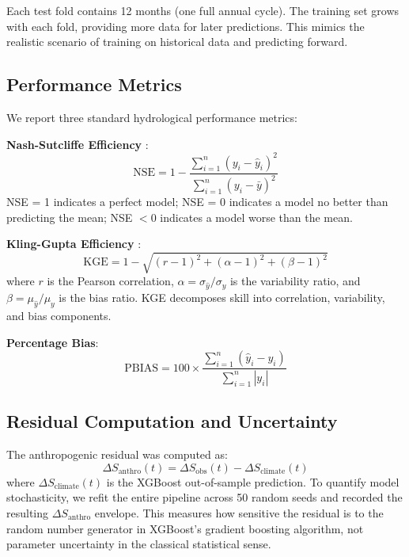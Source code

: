 \documentclass[12pt,a4paper,oneside]{report}
\newcommand{\dSobs}{\Delta S_{\mathrm{obs}}}
\newcommand{\dSclim}{\Delta S_{\mathrm{climate}}}
\newcommand{\dSanthro}{\Delta S_{\mathrm{anthro}}}
\newcommand{\NSE}{\mathrm{NSE}}
\newcommand{\KGE}{\mathrm{KGE}}
\begin{document}
Each test fold contains 12 months (one full annual cycle). The training set
grows with each fold, providing more data for later predictions. This mimics
the realistic scenario of training on historical data and predicting forward.

\subsection{Performance Metrics}

We report three standard hydrological performance metrics:

\textbf{Nash-Sutcliffe Efficiency} \citep{Nash1970}:
\begin{equation}
  \NSE = 1 - \frac{\sum_{i=1}^{n}(y_i - \hat{y}_i)^2}
                   {\sum_{i=1}^{n}(y_i - \bar{y})^2}
  \label{eq:nse}
\end{equation}
NSE = 1 indicates a perfect model; NSE = 0 indicates a model no better than
predicting the mean; NSE $< 0$ indicates a model worse than the mean.

\textbf{Kling-Gupta Efficiency} \citep{Kling2012}:
\begin{equation}
  \KGE = 1 - \sqrt{(r - 1)^2 + (\alpha - 1)^2 + (\beta - 1)^2}
  \label{eq:kge}
\end{equation}
where $r$ is the Pearson correlation, $\alpha = \sigma_{\hat{y}} / \sigma_y$
is the variability ratio, and $\beta = \mu_{\hat{y}} / \mu_y$ is the bias
ratio. KGE decomposes skill into correlation, variability, and bias
components.

\textbf{Percentage Bias}:
\begin{equation}
  \mathrm{PBIAS} = 100 \times \frac{\sum_{i=1}^{n}(\hat{y}_i - y_i)}
                                    {\sum_{i=1}^{n} |y_i|}
  \label{eq:pbias}
\end{equation}

\subsection{Residual Computation and Uncertainty}

The anthropogenic residual was computed as:
\begin{equation}
  \dSanthro(t) = \dSobs(t) - \dSclim(t)
  \label{eq:residual}
\end{equation}
where $\dSclim(t)$ is the XGBoost out-of-sample prediction. To quantify
model stochasticity, we refit the entire pipeline across 50 random seeds and
recorded the resulting $\dSanthro$ envelope. This measures how sensitive the
residual is to the random number generator in XGBoost's gradient boosting
algorithm, not parameter uncertainty in the classical statistical sense.
\end{document}
